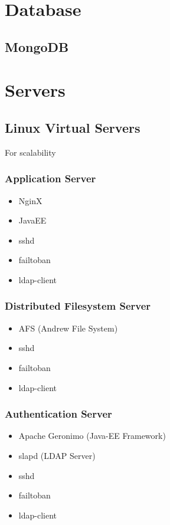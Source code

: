 
\section{Database}
	\subsection{MongoDB}
		
\section{Servers}
	\subsection{Linux Virtual Servers}
		For scalability
		\subsubsection{Application Server}
		\begin{itemize}
			\item NginX
			\item JavaEE
			\item sshd
			\item failtoban
			\item ldap-client
		\end{itemize}
		\subsubsection{Distributed Filesystem Server}
		\begin{itemize}
			\item AFS (Andrew File System)
			\item sshd
			\item failtoban
			\item ldap-client
		\end{itemize}
		\subsubsection{Authentication Server}
		\begin{itemize}
			\item Apache Geronimo (Java-EE Framework)
			\item slapd (LDAP Server)
			\item sshd
			\item failtoban
			\item ldap-client
		\end{itemize}		
